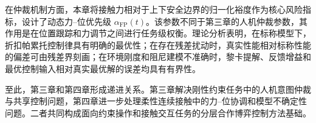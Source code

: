 在仲裁机制方面，本章将接触力相对于上下安全边界的归一化裕度作为核心风险指标，设计了动态力--位优先级 $\alpha_{\mathrm{FP}}(t)$。该参数不同于第三章的人机仲裁参数，其作用是在位置跟踪和力调节之间进行任务级权衡。理论分析表明，在标称模型下，折扣帕累托控制律具有明确的最优性；在存在残差扰动时，真实性能相对标称性能的偏差可由残差界刻画；在环境刚度和阻尼建模不准确时，黎卡提解、反馈增益和最优控制输入相对真实最优解的误差均具有有界性。

至此，第三章和第四章形成递进关系。第三章解决刚性约束任务中的人机意图仲裁与共享控制问题，第四章进一步处理柔性连续接触中的力--位协调和模型不确定性问题。二者共同构成面向约束操作和接触交互任务的分层合作博弈控制方法基础。
